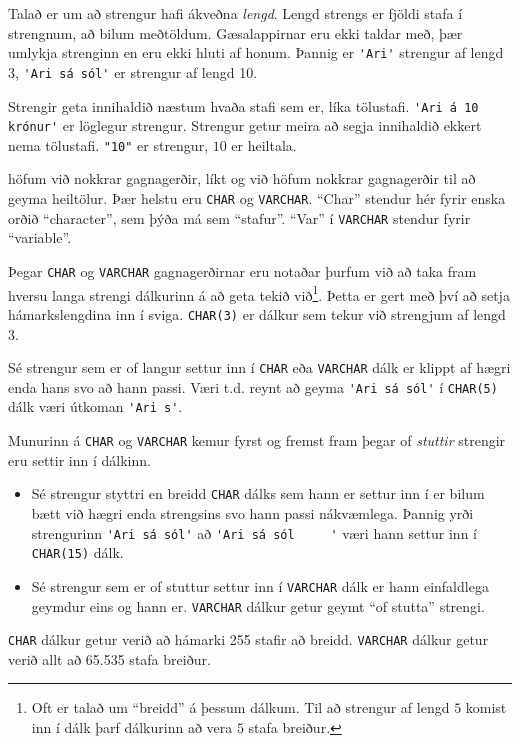Talað er um að strengur hafi ákveðna \emph{lengd}. Lengd strengs er fjöldi stafa í strengnum, að bilum meðtöldum. Gæsalappirnar eru ekki taldar með, þær umlykja strenginn en eru ekki hluti af honum. Þannig er \verb|'Ari'| strengur af lengd 3, \verb|'Ari sá sól'| er strengur af lengd 10.

Strengir geta innihaldið næstum hvaða stafi sem er, líka tölustafi. \verb|'Ari á 10 krónur'| er löglegur strengur. Strengur getur meira að segja innihaldið ekkert nema tölustafi. \verb|"10"| er strengur, $10$ er heiltala.

 höfum við nokkrar gagnagerðir, líkt og við höfum nokkrar gagnagerðir til að geyma heiltölur. Þær helstu eru \verb|CHAR| og \verb|VARCHAR|. ``Char'' stendur hér fyrir enska orðið ``character'', sem þýða má sem ``stafur''. ``Var'' í \verb|VARCHAR| stendur fyrir ``variable''. 

Þegar \verb|CHAR| og \verb|VARCHAR| gagnagerðirnar eru notaðar þurfum við að taka fram hversu langa strengi dálkurinn á að geta tekið við\footnote{Oft er talað um ``breidd'' á þessum dálkum. Til að strengur af lengd $5$ komist inn í dálk þarf dálkurinn að vera $5$ stafa breiður.}. Þetta er gert með því að setja hámarkslengdina inn í sviga. \verb|CHAR(3)| er dálkur sem tekur við strengjum af lengd 3.

Sé strengur sem er of langur settur inn í \verb|CHAR| eða \verb|VARCHAR| dálk er klippt af hægri enda hans svo að hann passi. Væri t.d. reynt að geyma \verb|'Ari sá sól'| í \verb|CHAR(5)| dálk væri útkoman \verb|'Ari s'|. 

Munurinn á \verb|CHAR| og \verb|VARCHAR| kemur fyrst og fremst fram þegar of \emph{stuttir} strengir eru settir inn í dálkinn. 
\begin{itemize}
 \item Sé strengur styttri en breidd \verb|CHAR| dálks sem hann er settur inn í er bilum bætt við hægri enda strengsins svo hann passi nákvæmlega. Þannig yrði strengurinn \verb|'Ari sá sól'| að \verb|'Ari sá sól     '| væri hann settur inn í \verb|CHAR(15)| dálk.
 \item Sé strengur sem er of stuttur settur inn í \verb|VARCHAR| dálk er hann einfaldlega geymdur eins og hann er. \verb|VARCHAR| dálkur getur geymt ``of stutta'' strengi.
\end{itemize}
\verb|CHAR| dálkur getur verið að hámarki 255 stafir að breidd. \verb|VARCHAR| dálkur getur verið allt að 65.535 stafa breiður.

